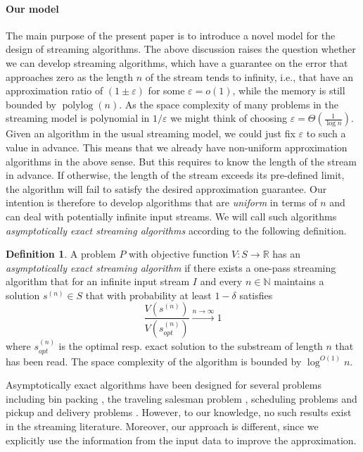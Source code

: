\documentclass[a4paper,11pt,oneside,english,onecolumn]{article}
\theoremstyle{definition}
\newtheorem{definition}[theorem]{Definition}
\newcommand{\bigO}[1]{\ensuremath{O\left( #1 \right)}}
\newcommand{\eps}{\ensuremath{\varepsilon}}
\begin{document}
\paragraph*{Our model} The main purpose of the present paper is to introduce a novel model for the design of streaming algorithms. The above discussion raises the question whether we can develop streaming algorithms, which have a guarantee on the error that approaches zero as the length $n$ of the stream tends to infinity, i.e., that have an approximation ratio of $(1\pm \eps)$ for some $\eps=o(1)$, while the memory is still bounded by $\operatorname{polylog}(n)$. As the space complexity of many problems in the streaming model is polynomial in $1/\eps$ we might think of choosing $\eps=\Theta(\frac{1}{\log n})$. Given an algorithm in the usual streaming model, we could just fix $\eps$ to such a value in advance. This means that we already have non-uniform approximation algorithms in the above sense. But this requires to know the length of the stream in advance. If otherwise, the length of the stream exceeds its pre-defined limit, the algorithm will fail to satisfy the desired approximation guarantee. Our intention is therefore to develop algorithms that are \emph{uniform} in terms of $n$ and can deal with potentially infinite input streams. We will call such algorithms \emph{asymptotically exact streaming algorithms} according to the following definition.

\begin{definition}
A problem $P$ with objective function $V: S \rightarrow \mathbb{R}$ has an \emph{asymptotically exact streaming algorithm} if there exists a one-pass streaming algorithm that for an infinite input stream $I$ and every $n\in\mathbb{N}$ maintains a solution $s^{(n)}\in S$ that with probability at least $1-\delta$ satisfies $$\frac{V(s^{(n)})}{V(s^{(n)}_{opt})}\xrightarrow{n \to \infty} 1$$ where $s^{(n)}_{opt}$ is the optimal resp. exact solution to the substream of length $n$ that has been read. The space complexity of the algorithm is bounded by $\log^{\bigO{1}} n$.
\end{definition}
Asymptotically exact algorithms have been designed for several problems including bin packing \cite{BinPacking}, the traveling salesman problem \cite{TSP}, scheduling problems \cite{Scheduling} and pickup and delivery problems \cite{PDP}. However, to our knowledge, no such results exist in the streaming literature. Moreover, our approach is different, since we explicitly use the information from the input data to improve the approximation.
\end{document}
